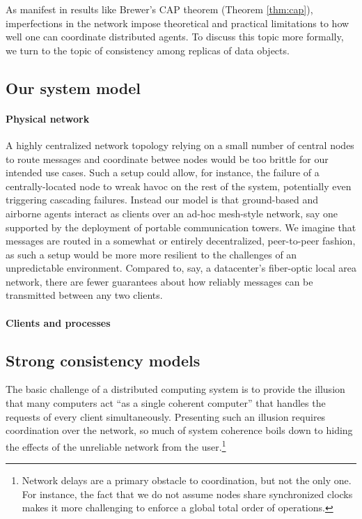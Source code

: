 As manifest in results like Brewer's CAP theorem (Theorem
\ref{thm:cap}), imperfections in the network impose theoretical and
practical limitations to how well one can coordinate distributed
agents. To discuss this topic more formally, we turn to the topic of
consistency among replicas of data objects.

\subsection{Our system model}

\paragraph{Physical network}
A highly centralized network topology relying on a small number of
central nodes to route messages and coordinate betwee nodes would be
too brittle for our intended use cases. Such a setup could allow, for
instance, the failure of a centrally-located node to wreak havoc on
the rest of the system, potentially even triggering cascading
failures. Instead our model is that ground-based and airborne agents
interact as clients over an ad-hoc mesh-style network, say one
supported by the deployment of portable communication towers. We
imagine that messages are routed in a somewhat or entirely
decentralized, peer-to-peer fashion, as such a setup would be more
more resilient to the challenges of an unpredictable
environment. Compared to, say, a datacenter's fiber-optic local area
network, there are fewer guarantees about how reliably messages can be
transmitted between any two clients.

\paragraph{Clients and processes}

\subsection{Strong consistency models}

The basic challenge of a distributed computing system is to provide
the illusion that many computers act ``as a single coherent computer''
\cite{TanenbaumSteen07} that handles the requests of every client
simultaneously. Presenting such an illusion requires coordination over
the network, so much of system coherence boils down to hiding the
effects of the unreliable network from the user.\footnote{Network
delays are a primary obstacle to coordination, but not the only
one. For instance, the fact that we do not assume nodes share
synchronized clocks makes it more challenging to enforce a global
total order of operations.}

